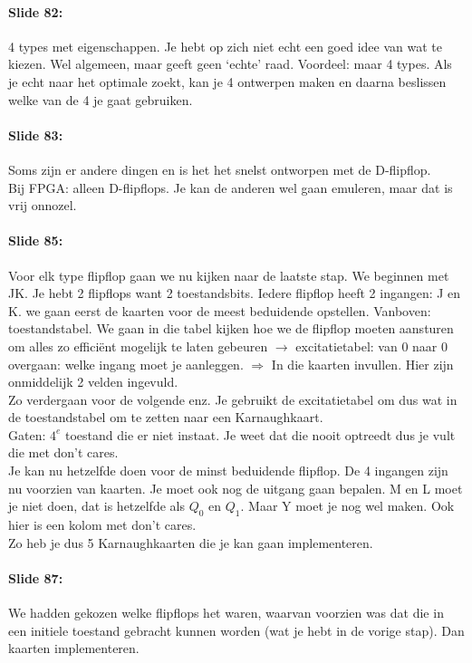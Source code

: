 \documentclass[10pt,a4paper]{book}
\begin{document}
\paragraph{Slide 82:} 4 types met eigenschappen.
Je hebt op zich niet echt een goed idee van wat te kiezen. Wel algemeen, maar geeft geen `echte' raad. Voordeel: maar 4 types. Als je echt naar het optimale zoekt, kan je 4 ontwerpen maken en daarna beslissen welke van de 4 je gaat gebruiken.

\paragraph{Slide 83:} Soms zijn er andere dingen en is het het snelst ontworpen met de D-flipflop.\\
Bij FPGA: alleen D-flipflops. Je kan de anderen wel gaan emuleren, maar dat is vrij onnozel.

\paragraph{Slide 85:} Voor elk type flipflop gaan we nu kijken naar de laatste stap. We beginnen met JK. Je hebt 2 flipflops want 2 toestandsbits. Iedere flipflop heeft 2 ingangen: J en K. we gaan eerst de kaarten voor de meest beduidende opstellen. Vanboven: toestandstabel. We gaan in die tabel kijken hoe we de flipflop moeten aansturen om alles zo effici\"ent mogelijk te laten gebeuren $\rightarrow$ excitatietabel: van 0 naar 0 overgaan: welke ingang moet je aanleggen. $\Rightarrow$ In die kaarten invullen. Hier zijn onmiddelijk 2 velden ingevuld.\\
Zo verdergaan voor de volgende enz. Je gebruikt de excitatietabel om dus wat in de toestandstabel om te zetten naar een Karnaughkaart.\\
Gaten: $4^e$ toestand die er niet instaat. Je weet dat die nooit optreedt dus je vult die met don't cares.\\
Je kan nu hetzelfde doen voor de minst beduidende flipflop. De 4 ingangen zijn nu voorzien van kaarten. Je moet ook nog de uitgang gaan bepalen. M en L moet je niet doen, dat is hetzelfde als $Q_0$ en $Q_1$. Maar Y moet je nog wel maken. Ook hier is een kolom met don't cares.\\
Zo heb je dus 5 Karnaughkaarten die je kan gaan implementeren.

\paragraph{Slide 87:} We hadden gekozen welke flipflops het waren, waarvan voorzien was dat die in een initiele toestand gebracht kunnen worden (wat je hebt in de vorige stap). Dan kaarten implementeren.
\end{document}
